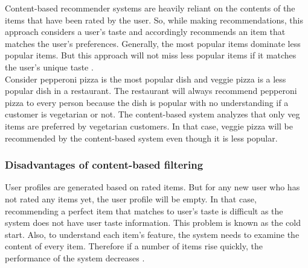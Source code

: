 Content-based recommender systems are heavily reliant on the contents of the items that have been rated by the user. So, while making recommendations, this approach considers a user's taste and accordingly recommends an item that matches the user's preferences. Generally, the most popular items dominate less popular items. But this approach will not miss less popular items if it matches the user's unique taste \cite{6}. \\
Consider pepperoni pizza is the most popular dish and veggie pizza is a less popular dish in a restaurant. The restaurant will always recommend pepperoni pizza to every person because the dish is popular with no understanding if a customer is vegetarian or not. The content-based system analyzes that only veg items are preferred by vegetarian customers. In that case, veggie pizza will be recommended by the content-based system even though it is less popular. 
\\
\subsubsection{Disadvantages of content-based filtering}

User profiles are generated based on rated items. But for any new user who has not rated any items yet, the user profile will be empty. In that case, recommending a perfect item that matches to user’s taste is difficult as the system does not have user taste information. This problem is known as the cold start. Also, to understand each item's feature, the system needs to examine the content of every item. Therefore if a number of items rise quickly, the performance of the system decreases \cite{6}.\\

